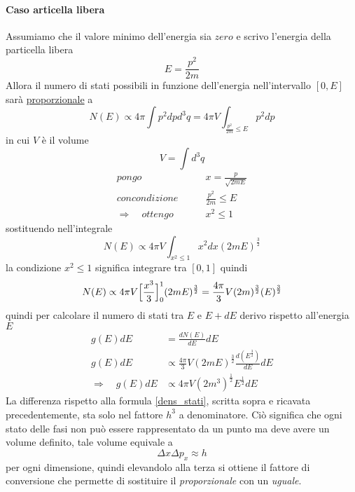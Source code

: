 \paragraph{Caso articella libera}
Assumiamo che il valore minimo dell'energia sia $zero$ e scrivo l'energia della particella libera
\begin{equation}
E = \frac{p^2}{2m} 
\end{equation}
Allora il numero di stati possibili in funzione dell'energia nell'intervallo $[0, E]$ sarà \underline{proporzionale} a
\begin{equation}
N(E) \propto 4 \pi \int p^2 dp d^3q = 4 \pi V \int_{\frac{p^2}{2m} \le E } p^2 dp
\end{equation}
in cui $V$ è il volume
\begin{equation}
V = \int d^3 q
\end{equation}
\begin{equation}
\begin{split}
pongo &\quad\quad x = \frac{p}{\sqrt{2m E}} \\
con condizione &\quad\quad \frac{p^2}{2m} \le E \\
\Rightarrow\quad ottengo &\quad\quad x^2 \le 1
\end{split}
\end{equation}
sostituendo nell'integrale
\begin{equation}
N(E) \propto 4\pi V \int_{x^2 \le 1} x^2 dx (2mE)^{ \frac{3}{2} }
\end{equation}
la condizione $x^2 \le 1$ significa integrare tra $[0, 1]$ quindi
\begin{equation}
N(E) \propto 4\pi V \Bigl[  \frac{x^3}{3}  \Bigr]_0^1 (2mE)^{ \frac{3}{2} } = \frac{4\pi}{3} V (2m)^{ \frac{3}{2} }(E)^{ \frac{3}{2} }
\end{equation}
quindi per calcolare il numero di stati tra $E$ e $E + dE$ derivo rispetto all'energia $E$
\begin{equation}
\begin{split}
g(E) dE & = \frac{d N(E)}{dE} dE \\
g(E) dE & \propto \frac{4\pi}{3} V (2mE)^{\frac{3}{2}} \frac{d (E^{ \frac{3}{2} }) }{dE}  dE \\
\Rightarrow\quad g(E) dE & \propto 4\pi V (2m^3)^{\frac{1}{2}} E^{ \frac{1}{2} }  dE
\end{split}
\end{equation}
La differenza rispetto alla formula \ref{dens_stati}, scritta sopra e ricavata precedentemente, sta solo nel fattore $h^3$ a denominatore.
Ciò significa che ogni stato delle fasi non può essere rappresentato da un punto ma deve avere un volume definito, tale volume equivale a
\begin{equation}
\Delta x \Delta p_x \approx h
\end{equation}
per ogni dimensione, quindi elevandolo alla terza si ottiene il fattore di conversione che permette di sostituire il \textit{proporzionale} con un \textit{uguale}.

